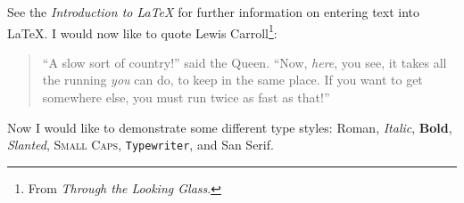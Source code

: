 
See the \emph{Introduction to \LaTeX} for further information on entering text into \LaTeX.
I would now like to quote Lewis Carroll\footnote{From \emph{Through
the Looking Glass}.}:
\begin{quote}
``A slow sort of country!'' said the Queen.
``Now, \emph{here}, you see, it takes all the running \emph{you} can do, to keep in the same place.
If you want to get somewhere else, you must run twice as fast as that!''
\end{quote}




Now I would like to demonstrate some different type styles:
\textrm{Roman}, \textit{Italic}, \textbf{Bold}, \textsl{Slanted}, \textsc{Small Caps},
\texttt{Typewriter}, and \textsf{San Serif}.

